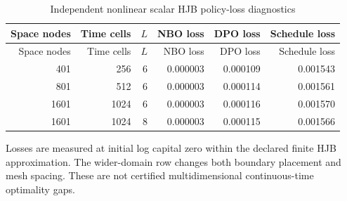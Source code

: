 \begingroup\small\setlength{\tabcolsep}{4pt}
\begin{longtable}{rrrrrr}
\caption{Independent nonlinear scalar HJB policy-loss diagnostics}\label{tab:r12reference}\\
\toprule
Space nodes & Time cells & $L$ & NBO loss & DPO loss & Schedule loss\\\midrule
\endfirsthead
\toprule
Space nodes & Time cells & $L$ & NBO loss & DPO loss & Schedule loss\\\midrule
\endhead
401 & 256 & 6 & 0.000003 & 0.000109 & 0.001543\\
801 & 512 & 6 & 0.000003 & 0.000114 & 0.001561\\
1601 & 1024 & 6 & 0.000003 & 0.000116 & 0.001570\\
1601 & 1024 & 8 & 0.000003 & 0.000115 & 0.001566\\
\bottomrule\end{longtable}
\noindent Losses are measured at initial log capital zero within the declared finite HJB approximation. The wider-domain row changes both boundary placement and mesh spacing. These are not certified multidimensional continuous-time optimality gaps.
\endgroup
